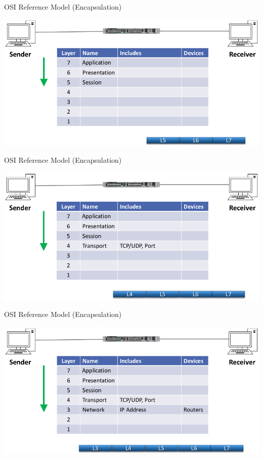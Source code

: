 \documentclass[pdflatex,compress,mathserif]{beamer}
\begin{document}
\begin{frame}{OSI Reference Model (Encapsulation)}
	\begin{center}
		\includegraphics[width=\linewidth]{img/img04}
	\end{center}
\end{frame}

\begin{frame}{OSI Reference Model (Encapsulation)}
	\begin{center}
		\includegraphics[width=\linewidth]{img/img05}
	\end{center}
\end{frame}

\begin{frame}{OSI Reference Model (Encapsulation)}
	\begin{center}
		\includegraphics[width=\linewidth]{img/img06}
	\end{center}
\end{frame}
\end{document}
